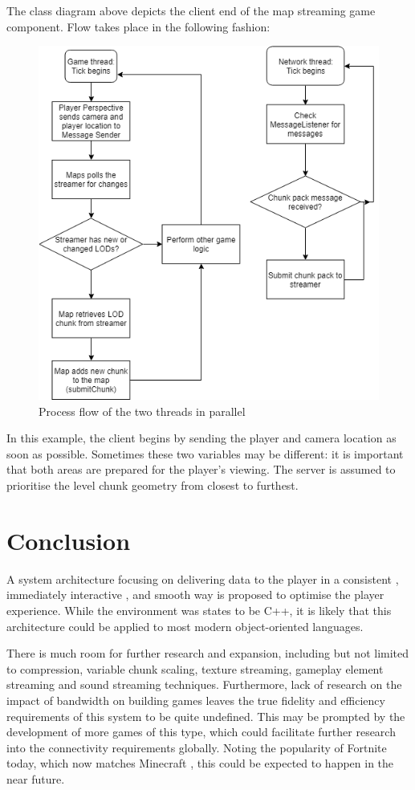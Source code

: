 \documentclass{scrartcl}
\begin{document}
The class diagram above depicts the client end of the map streaming game component. Flow takes place in the following fashion:

\begin{figure}[H]
	\includegraphics[width=0.7\linewidth]{Basic_Flowchart.png}
	\caption{Process flow of the two threads in parallel}
	\label{fig:simpleflow}
\end{figure}

In this example, the client begins by sending the player and camera location as soon as possible. Sometimes these two variables may be different: it is important that both areas are prepared for the player's viewing. The server is assumed to prioritise the level chunk geometry from closest to furthest.

\section{Conclusion}
A system architecture focusing on delivering data to the player in a consistent \cite{qoelargestudy} \cite{lagragequits}, immediately interactive \cite{motivation}, and smooth \cite{graphicsvsexperience} \cite{lagragequits} way is proposed to optimise the player experience. While the environment was states to be C++, it is likely that this architecture could be applied to most modern object-oriented languages.

There is much room for further research and expansion, including but not limited to compression, variable chunk scaling, texture streaming, gameplay element streaming and sound streaming techniques. Furthermore, lack of research on the impact of bandwidth on building games leaves the true fidelity and efficiency requirements of this system to be quite undefined. This may be prompted by the development of more games of this type, which could facilitate further research into the connectivity requirements globally. Noting the popularity of Fortnite today, which now matches Minecraft \cite{minecraftnite}, this could be expected to happen in the near future.

 

\end{document}
